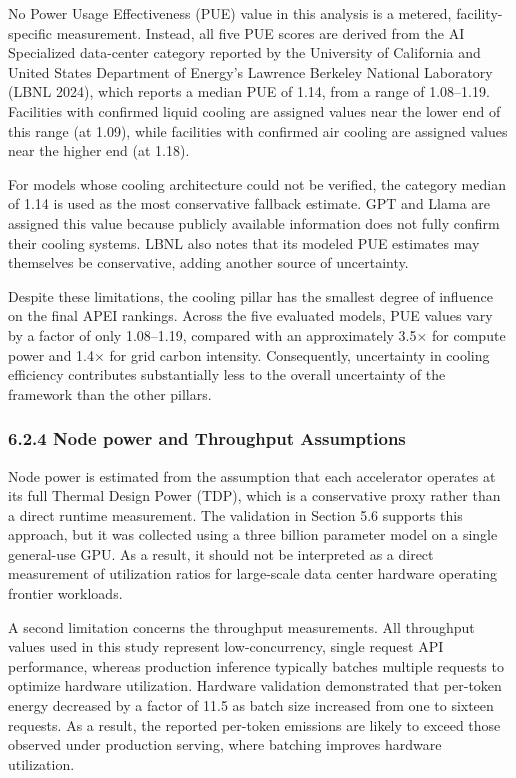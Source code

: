 \documentclass[11pt]{article}
\begin{document}
No Power Usage Effectiveness (PUE) value in this analysis is a metered, facility-specific measurement. Instead, all five PUE scores are derived from the AI Specialized data-center category reported by the University of California and United States Department of Energy's Lawrence Berkeley National Laboratory (LBNL 2024), which reports a median PUE of 1.14, from a range of 1.08--1.19. Facilities with confirmed liquid cooling are assigned values near the lower end of this range (at 1.09), while facilities with confirmed air cooling are assigned values near the higher end (at 1.18).

For models whose cooling architecture could not be verified, the category median of 1.14 is used as the most conservative fallback estimate. GPT and Llama are assigned this value because publicly available information does not fully confirm their cooling systems. LBNL also notes that its modeled PUE estimates may themselves be conservative, adding another source of uncertainty.

Despite these limitations, the cooling pillar has the smallest degree of influence on the final APEI rankings. Across the five evaluated models, PUE values vary by a factor of only 1.08--1.19, compared with an approximately 3.5$\times$ for compute power and 1.4$\times$ for grid carbon intensity. Consequently, uncertainty in cooling efficiency contributes substantially less to the overall uncertainty of the framework than the other pillars.

\subsubsection*{6.2.4 Node power and Throughput Assumptions}

Node power is estimated from the assumption that each accelerator operates at its full Thermal Design Power (TDP), which is a conservative proxy rather than a direct runtime measurement. The validation in Section 5.6 supports this approach, but it was collected using a three billion parameter model on a single general-use GPU. As a result, it should not be interpreted as a direct measurement of utilization ratios for large-scale data center hardware operating frontier workloads.

A second limitation concerns the throughput measurements. All throughput values used in this study represent low-concurrency, single request API performance, whereas production inference typically batches multiple requests to optimize hardware utilization. Hardware validation demonstrated that per-token energy decreased by a factor of 11.5 as batch size increased from one to sixteen requests. As a result, the reported per-token emissions are likely to exceed those observed under production serving, where batching improves hardware utilization.
\end{document}
